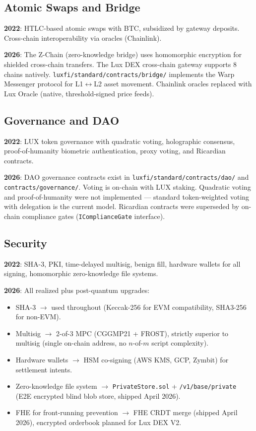 \documentclass[11pt,a4paper]{article}
\begin{document}
\subsection{Atomic Swaps and Bridge}

\textbf{2022}: HTLC-based atomic swaps with BTC, subsidized
by gateway deposits. Cross-chain interoperability via oracles
(Chainlink).

\textbf{2026}: The Z-Chain (zero-knowledge bridge) uses
homomorphic encryption for shielded cross-chain transfers.
The Lux DEX cross-chain gateway supports 8 chains natively.
\texttt{luxfi/standard/contracts/bridge/} implements the
Warp Messenger protocol for L1$\leftrightarrow$L2 asset
movement. Chainlink oracles replaced with Lux Oracle
(native, threshold-signed price feeds).

\subsection{Governance and DAO}

\textbf{2022}: LUX token governance with quadratic voting,
holographic consensus, proof-of-humanity biometric
authentication, proxy voting, and Ricardian contracts.

\textbf{2026}: DAO governance contracts exist in
\texttt{luxfi/standard/contracts/dao/} and
\texttt{contracts/governance/}. Voting is on-chain with
LUX staking. Quadratic voting and proof-of-humanity were
not implemented --- standard token-weighted voting with
delegation is the current model. Ricardian contracts were
superseded by on-chain compliance gates
(\texttt{IComplianceGate} interface).

\subsection{Security}

\textbf{2022}: SHA-3, PKI, time-delayed multisig, benign
fill, hardware wallets for all signing, homomorphic
zero-knowledge file systems.

\textbf{2026}: All realized plus post-quantum upgrades:
\begin{itemize}[nosep]
  \item SHA-3 $\rightarrow$ used throughout (Keccak-256 for
        EVM compatibility, SHA3-256 for non-EVM).
  \item Multisig $\rightarrow$ 2-of-3 MPC
        (CGGMP21 + FROST), strictly superior to multisig
        (single on-chain address, no $n$-of-$m$ script
        complexity).
  \item Hardware wallets $\rightarrow$ HSM co-signing
        (AWS KMS, GCP, Zymbit) for settlement intents.
  \item Zero-knowledge file system $\rightarrow$
        \texttt{PrivateStore.sol} + \texttt{/v1/base/private}
        (E2E encrypted blind blob store, shipped April 2026).
  \item FHE for front-running prevention $\rightarrow$ FHE
        CRDT merge (shipped April 2026), encrypted orderbook
        planned for Lux DEX V2.
\end{itemize}
\end{document}
